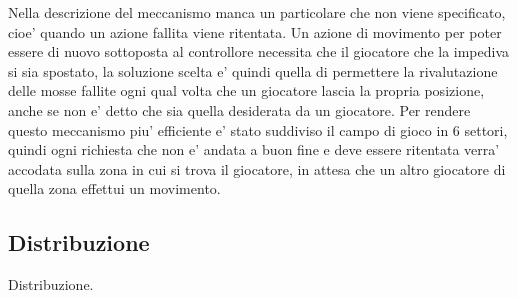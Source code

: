 Nella descrizione del meccanismo manca un particolare che non viene specificato, cioe’ quando un azione fallita viene ritentata. Un azione di movimento per poter essere di nuovo sottoposta al controllore necessita che il giocatore che la impediva si sia spostato, la soluzione scelta e’ quindi quella di permettere la rivalutazione delle mosse fallite ogni qual volta che un giocatore lascia la propria posizione, anche se non e’ detto che sia quella desiderata da un giocatore. Per rendere questo meccanismo piu’ efficiente e’ stato suddiviso il campo di gioco in 6 settori, quindi ogni richiesta che non e’ andata a buon fine e deve essere ritentata verra’ accodata sulla zona in cui si trova il giocatore, in attesa che un altro giocatore di quella zona effettui un movimento.

\subsection*{Distribuzione}
%
\label{sec:analisi_distribuzione}

Distribuzione.



